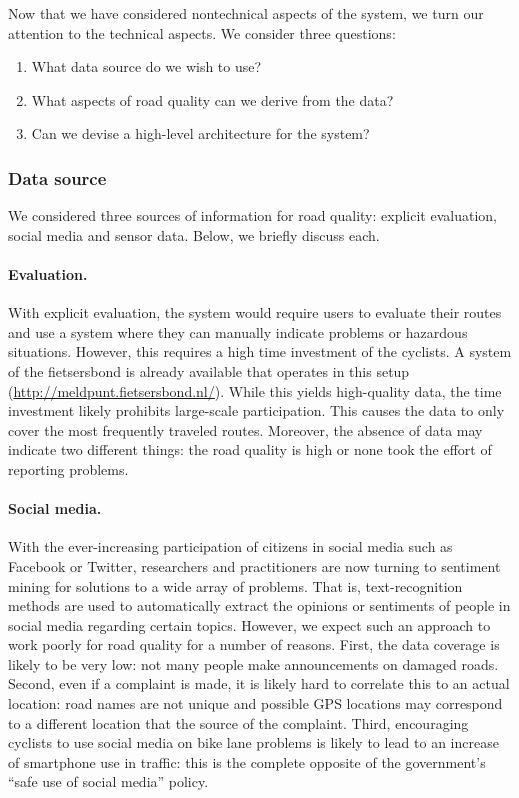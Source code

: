 \documentclass[a4paper,11pt]{article}
\begin{document}
Now that we have considered nontechnical aspects of the system, we turn our attention to the technical aspects. We consider three questions:
\begin{enumerate}\setlength{\itemsep}{-3pt}
\item What data source do we wish to use?
\item What aspects of road quality can we derive from the data?
\item Can we devise a high-level architecture for the system?
\end{enumerate}

\subsubsection{Data source}
\label{ssec:datasource}

We considered three sources of information for road quality: explicit evaluation, social media and sensor data. Below, we briefly discuss each.

\paragraph{Evaluation.}
With explicit evaluation, the system would require users to evaluate their routes and use a system where they can manually indicate problems or hazardous situations. However, this requires a high time investment of the cyclists. A system of the fietsersbond is already available that operates in this setup (\url{http://meldpunt.fietsersbond.nl/}). While this yields high-quality data, the time investment likely prohibits large-scale participation. This causes the data to only cover the most frequently traveled routes. Moreover, the absence of data may indicate two different things: the road quality is high or none took the effort of reporting problems.

\paragraph{Social media.}
With the ever-increasing participation of citizens in social media such as Facebook or Twitter, researchers and practitioners are now turning to sentiment mining for solutions to a wide array of problems. That is, text-recognition methods are used to automatically extract the opinions or sentiments of people in social media regarding certain topics. However, we expect such an approach to work poorly for road quality for a number of reasons. First, the data coverage is likely to be very low: not many people make announcements on damaged roads. Second, even if a complaint is made, it is likely hard to correlate this to an actual location: road names are not unique and possible GPS locations may correspond to a different location that the source of the complaint. Third, encouraging cyclists to use social media on bike lane problems is likely to lead to an increase of smartphone use in traffic: this is the complete opposite of the government's  ``safe use of social media'' policy.
\end{document}
